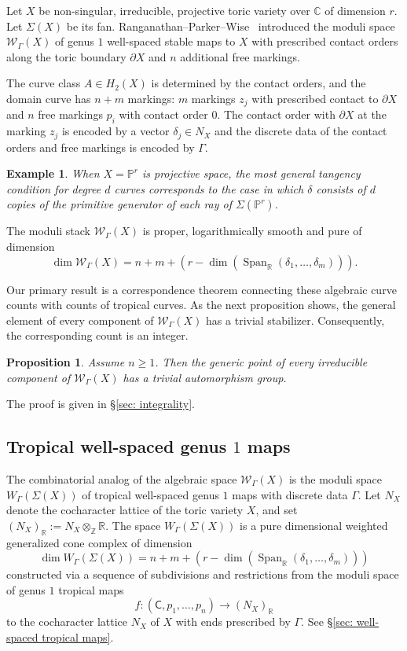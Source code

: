 \documentclass{article}
\def\cW{\mathcal{W}}
\def\C{\mathbb{C}}
\def\R{\mathbb{R}}
\newtheorem{example}[definition]{Example}
\newtheorem{proposition}[definition]{Proposition}
\begin{document}
Let $X$ be non-singular, irreducible, projective toric variety over $\C$ of dimension $r$. Let $\Sigma(X)$ be its fan. Ranganathan--Parker--Wise~\cite{RSWI, RSWII} introduced the moduli space $\mathcal{W}_{\Gamma}(X)$ of genus $1$ well-spaced stable maps to $X$ with prescribed contact orders along the toric boundary $\partial X$ 
and $n$ additional free markings. 

The curve class $A \in H_2(X)$ is determined by the contact orders, and the domain curve has $n+m$ markings: $m$ markings $z_j$ with prescribed contact to $\partial X$ and $n$ free markings $p_i$ with contact order $0$. The contact order with $\partial X$ at the marking $z_j$ is encoded by a vector $\delta_j \in N_X$ and the discrete data of the contact orders and free markings is encoded by $\Gamma$. 

\begin{example}
    When $X=\mathbb{P}^r$ is projective space, the most general tangency condition for degree $d$ curves corresponds to the case in which $\delta$ consists of $d$ copies of the primitive generator of each ray of $\Sigma(\mathbb{P}^r)$. 
\end{example}

The moduli stack $\mathcal{W}_{\Gamma}(X)$ is proper, logarithmically smooth and pure of dimension 
\[
\dim \mathcal{W}_{\Gamma}(X) = n +  m +(r-\operatorname{dim}(\operatorname{Span}_\R(\delta_1,\ldots,\delta_m))).
\]


Our primary result is a correspondence theorem connecting these algebraic curve counts with counts of tropical curves. As the next proposition shows, the general element of every component of $\cW_\Gamma(X)$ has a trivial stabilizer. Consequently, the corresponding count is an integer.

\begin{proposition}\label{prop: integrality}
Assume $n \geq 1$. Then the generic point of every irreducible component of $\mathcal{W}_\Gamma(X)$ has a trivial automorphism group.
\end{proposition}

The proof is given in \S\ref{sec: integrality}.



\subsection{Tropical well-spaced genus $1$ maps}
The combinatorial analog of the algebraic space $\mathcal{W}_{\Gamma}(X)$ is the moduli space 
$W_{\Gamma}(\Sigma(X))$ of tropical well-spaced genus $1$ maps with discrete data $\Gamma$. 
Let $N_X$ denote the cocharacter lattice of the toric variety $X$, and set
$
(N_{X})_{\mathbb{R}} := N_X \otimes_{\mathbb{Z}} \mathbb{R}.
$
The space $W_{\Gamma}(\Sigma(X))$ is a pure dimensional weighted generalized cone complex of dimension 
$$
\dim W_{\Gamma}(\Sigma(X)) = n +  m +(r-\operatorname{dim}(\operatorname{Span}_\R(\delta_1,\ldots,\delta_m)))
$$ 
constructed via a sequence of subdivisions and restrictions from the moduli space of genus $1$ tropical maps 
\[
f: (\mathsf{C},p_1,\ldots,p_n) \longrightarrow (N_X)_{\mathbb{R}}
\]
to the cocharacter lattice $N_X$ of $X$ with ends prescribed by $\Gamma$. See \S\ref{sec: well-spaced tropical maps}. 
\end{document}
